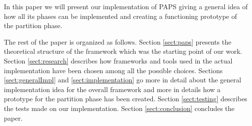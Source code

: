 In this paper we will present our implementation of PAPS giving a general idea of how all its phases can be 
implemented and creating a functioning prototype of the partition phase. 

The rest of the paper is organized as follows. Section \ref{sect:paps} presents the theoretical structure of the 
framework which was the starting point of our work. Section \ref{sect:research} describes how frameworks and tools
used in the actual implementation have been chosen among all the possible choices. Sections \ref{sect:generalImpl}
and \ref{sect:implementation} go more in detail about the general implementation idea for the overall framework and
more in details how a prototype for the partition phase has been created. Section \ref{sect:testing} describes the tests
made on our implementation.
Section \ref{sect:conclusion} concludes 
the paper.
